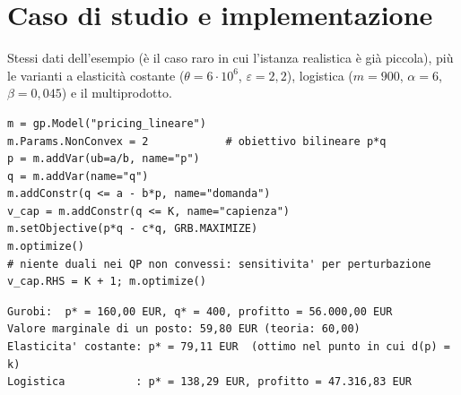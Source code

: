 \section{Caso di studio e implementazione}

Stessi dati dell'esempio (è il caso raro in cui l'istanza realistica è già piccola),
più le varianti a elasticità costante ($\theta = 6 \cdot 10^6$, $\varepsilon = 2{,}2$),
logistica ($m = 900$, $\alpha = 6$, $\beta = 0{,}045$) e il multiprodotto.

\begin{lstlisting}[style=python]
m = gp.Model("pricing_lineare")
m.Params.NonConvex = 2            # obiettivo bilineare p*q
p = m.addVar(ub=a/b, name="p")
q = m.addVar(name="q")
m.addConstr(q <= a - b*p, name="domanda")
v_cap = m.addConstr(q <= K, name="capienza")
m.setObjective(p*q - c*q, GRB.MAXIMIZE)
m.optimize()
# niente duali nei QP non convessi: sensitivita' per perturbazione
v_cap.RHS = K + 1; m.optimize()
\end{lstlisting}

\begin{lstlisting}[style=output]
Gurobi:  p* = 160,00 EUR, q* = 400, profitto = 56.000,00 EUR
Valore marginale di un posto: 59,80 EUR (teoria: 60,00)
Elasticita' costante: p* = 79,11 EUR  (ottimo nel punto in cui d(p) = k)
Logistica           : p* = 138,29 EUR, profitto = 47.316,83 EUR
\end{lstlisting}

